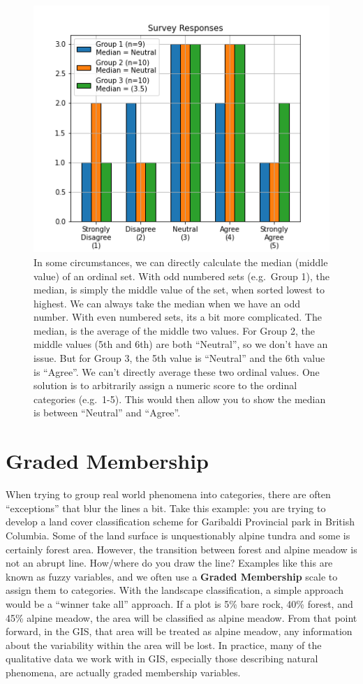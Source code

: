 \documentclass[
]{book}
\begin{document}
\begin{figure}
\centering
\includegraphics{images/03-ordinal-operatons.png}
\caption{In some circumstances, we can directly calculate the median (middle value) of an ordinal set. With odd numbered sets (e.g.~Group 1), the median, is simply the middle value of the set, when sorted lowest to highest. We can always take the median when we have an odd number. With even numbered sets, its a bit more complicated. The median, is the average of the middle two values. For Group 2, the middle values (5th and 6th) are both ``Neutral'', so we don't have an issue. But for Group 3, the 5th value is ``Neutral'' and the 6th value is ``Agree''. We can't directly average these two ordinal values. One solution is to arbitrarily assign a numeric score to the ordinal categories (e.g.~1-5). This would then allow you to show the median is between ``Neutral'' and ``Agree''.}
\end{figure}

\hypertarget{graded-membership}{%
\section{Graded Membership}\label{graded-membership}}

When trying to group real world phenomena into categories, there are often ``exceptions'' that blur the lines a bit. Take this example: you are trying to develop a land cover classification scheme for Garibaldi Provincial park in British Columbia. Some of the land surface is unquestionably alpine tundra and some is certainly forest area. However, the transition between forest and alpine meadow is not an abrupt line. How/where do you draw the line? Examples like this are known as fuzzy variables, and we often use a \textbf{Graded Membership} scale to assign them to categories. With the landscape classification, a simple approach would be a ``winner take all'' approach. If a plot is 5\% bare rock, 40\% forest, and 45\% alpine meadow, the area will be classified as alpine meadow. From that point forward, in the GIS, that area will be treated as alpine meadow, any information about the variability within the area will be lost. In practice, many of the qualitative data we work with in GIS, especially those describing natural phenomena, are actually graded membership variables.
\end{document}
